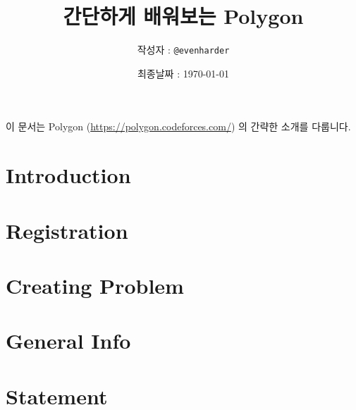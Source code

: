 \documentclass{article}
\title{간단하게 배워보는 Polygon}
\author{작성자 : \texttt{@evenharder}}
\date{최종날짜 : \today}
\begin{document}
    \maketitle
    이 문서는 Polygon (\url{https://polygon.codeforces.com/}) 의 간략한 소개를 다룹니다.
    \tableofcontents
    \newpage
    \section{Introduction}
    
    \section{Registration}
    
    \section{Creating Problem}
    
    \section{General Info}
    
    \section{Statement}
    
\end{document}
